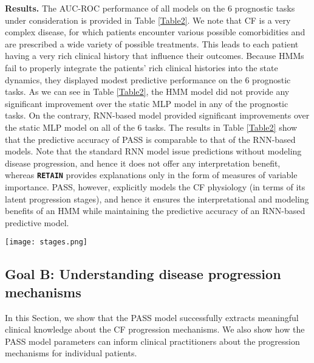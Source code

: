 \documentclass[twoside,11pt]{article}
\begin{document}
{\bf Results.} The AUC-ROC performance of all models on the 6 prognostic tasks under consideration is provided in Table \ref{Table2}. We note that CF is a very complex disease, for which patients encounter various possible comorbidities and are prescribed a wide variety of possible treatments. This leads to each patient having a very rich clinical history that influence their outcomes. Because HMMs fail to properly integrate the patients' rich clinical histories into the state dynamics, they displayed modest predictive performance on the 6 prognostic tasks. As we can see in Table \ref{Table2}, the HMM model did not provide any significant improvement over the static MLP model in any of the prognostic tasks. On the contrary, RNN-based model provided significant improvements over the static MLP model on all of the 6 tasks. The results in Table \ref{Table2} show that the predictive accuracy of PASS is comparable to that of the RNN-based models. Note that the standard RNN model issue predictions without modeling disease progression, and hence it does not offer any interpretation benefit, whereas \textbf{\texttt{RETAIN}} provides explanations only in the form of measures of variable importance. PASS, however, explicitly models the CF physiology (in terms of its latent progression stages), and hence it ensures the interpretational and modeling benefits of an HMM while maintaining the predictive accuracy of an RNN-based predictive model.

\begin{figure*}[t]
  \centering
  \texttt{[image: stages.png]}
	\label{Fig5}
\end{figure*}

\subsection{{\bf Goal B}: Understanding disease progression mechanisms}
\label{SSec52}

In this Section, we show that the PASS model successfully extracts meaningful clinical knowledge about the CF progression mechanisms. We also show how the PASS model parameters can inform clinical practitioners about the progression mechanisms for individual patients.  
\end{document}
